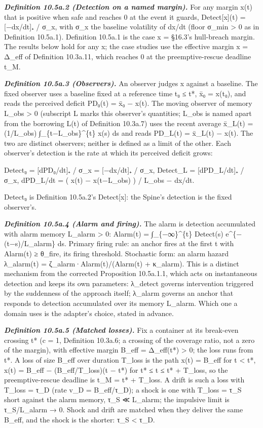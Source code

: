 \documentclass[
]{article}
\begin{document}
\emph{\textbf{Definition 10.5a.2 (Detection on a named margin).}} For
any margin x(t) that is positive when safe and reaches 0 at the event it
guards, Detect{[}x{]}(t) = {[}−dx/dt{]}₊ / σ\_x, with σ\_x the baseline
volatility of dx/dt (floor σ\_min \textgreater{} 0 as in Definition
10.5a.1). Definition 10.5a.1 is the case x = §16.3's hull-breach margin.
The results below hold for any x; the case studies use the effective
margin x = Δ\_eff of Definition 10.3a.11, which reaches 0 at the
preemptive-rescue deadline t\_M.

\emph{\textbf{Definition 10.5a.3 (Observers).}} An observer judges x
against a baseline. The fixed observer uses a baseline fixed at a
reference time t₀ ≤ t*, x̄₀ = x(t₀), and reads the perceived deficit
PD₀(t) = x̄₀ − x(t). The moving observer of memory L\_obs \textgreater{}
0 (subscript L marks this observer's quantities; L\_obs is named apart
from the borrowing L(t) of Definition 10.3a.7) uses the recent average
x̄\_L(t) = (1/L\_obs) ∫\_\{t−L\_obs\}\^{}\{t\} x(s) ds and reads PD\_L(t)
= x̄\_L(t) − x(t). The two are distinct observers; neither is defined as
a limit of the other. Each observer's detection is the rate at which its
perceived deficit grows:

Detect₀ = {[}dPD₀/dt{]}₊ / σ\_x = {[}−dx/dt{]}₊ / σ\_x, Detect\_L =
{[}dPD\_L/dt{]}₊ / σ\_x, dPD\_L/dt = ( x(t) − x(t−L\_obs) ) / L\_obs −
dx/dt.

Detect₀ is Definition 10.5a.2's Detect{[}x{]}: the Spine's detection is
the fixed observer's.

\emph{\textbf{Definition 10.5a.4 (Alarm and firing).}} The alarm is
detection accumulated with alarm memory L\_alarm \textgreater{} 0:
Alarm(t) = ∫\_\{−∞\}\^{}\{t\} Detect(s) e\^{}\{−(t−s)/L\_alarm\} ds.
Primary firing rule: an anchor fires at the first t with Alarm(t) ≥
θ\_fire, its firing threshold. Stochastic form: an alarm hazard
λ\_alarm(t) = ζ\_alarm·Alarm(t)/(Alarm(t) + κ\_alarm). This is a
distinct mechanism from the corrected Proposition 10.5a.1.1, which acts
on instantaneous detection and keeps its own parameters: λ\_detect
governs intervention triggered by the suddenness of the approach itself;
λ\_alarm governs an anchor that responds to detection accumulated over
its memory L\_alarm. Which one a domain uses is the adapter's choice,
stated in advance.

\emph{\textbf{Definition 10.5a.5 (Matched losses).}} Fix a container at
its break-even crossing t* (c = 1, Definition 10.3a.6; a crossing of the
coverage ratio, not a zero of the margin), with effective margin B\_eff
= Δ\_eff(t*) \textgreater{} 0; the loss runs from t*. A loss of size
B\_eff over duration T\_loss is the path x(t) = B\_eff for t \textless{}
t*, x(t) = B\_eff − (B\_eff/T\_loss)(t − t*) for t* ≤ t ≤ t* + T\_loss,
so the preemptive-rescue deadline is t\_M = t* + T\_loss. A drift is
such a loss with T\_loss = τ\_D (rate v\_D = B\_eff/τ\_D); a shock is
one with T\_loss = τ\_S short against the alarm memory, τ\_S ≪ L\_alarm;
the impulsive limit is τ\_S/L\_alarm → 0. Shock and drift are matched
when they deliver the same B\_eff, and the shock is the shorter: τ\_S
\textless{} τ\_D.
\end{document}
